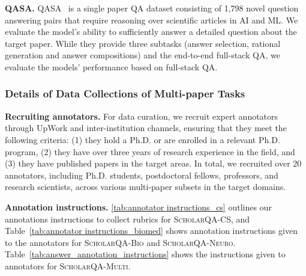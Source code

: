 \documentclass{article} %
\renewcommand{\paragraph}[1]{\noindent \textbf{#1}}
\begin{document}
\paragraph{QASA.}
\textsc{QASA}~\citep{lee2023qasa} is a single paper QA dataset consisting of 1,798
novel question answering pairs that require reasoning over scientific articles in AI and ML. We evaluate the model's ability to sufficiently answer a detailed question about the target paper. While they provide three subtasks (answer selection, rational generation and answer compositions) and the end-to-end full-stack QA, we evaluate the models' performance based on full-stack QA. 


\subsubsection{Details of Data Collections of Multi-paper Tasks }

\paragraph{Recruiting annotators.} 
For data curation, we recruit expert annotators through UpWork and inter-institution channels, ensuring that they meet the following criteria: (1) they hold a Ph.D. or are enrolled in a relevant Ph.D. program, (2) they have over three years of research experience in the field, and (3) they have published papers in the target areas. In total, we recruited over 20 annotators, including Ph.D. students, postdoctoral fellows, professors, and research scientists, across various multi-paper subsets in the target domains. 

\paragraph{Annotation instructions.} 
{\autoref{tab:annotator instructions_cs} outlines our annotations instructions to collect rubrics for \textsc{ScholarQA-CS}}, and 
Table~\ref{tab:annotator instructions_biomed} shows annotation instructions given to the annotators for \textsc{ScholarQA-Bio} and \textsc{ScholarQA-Neuro}.
Table~\ref{tab:answer_annotation_instructions} shows the instructions given to annotators for \textsc{ScholarQA-Multi}. 
\end{document}
